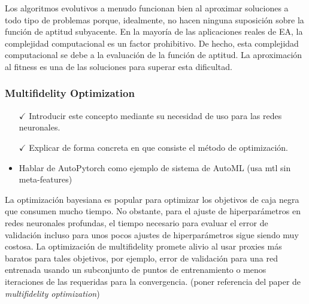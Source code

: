 Los algoritmos evolutivos a menudo funcionan bien al aproximar soluciones a todo tipo de problemas porque, idealmente, no hacen ninguna suposición sobre la función de aptitud subyacente. En la mayoría de las aplicaciones reales de EA, la complejidad computacional es un factor prohibitivo. De hecho, esta complejidad computacional se debe a la evaluación de la función de aptitud. La aproximación al fitness es una de las soluciones para superar esta dificultad.

\subsubsection{Multifidelity Optimization}


\begin{itemize}
	\item[$\checkmark$] Introducir este concepto mediante su necesidad de uso para las redes neuronales.
	\item[$\checkmark$] Explicar de forma concreta en que consiste el método de optimización.
	\item Hablar de AutoPytorch como ejemplo de sistema de AutoML (usa mtl sin meta-features)
\end{itemize}

La optimización bayesiana es popular para optimizar los objetivos de caja negra que consumen mucho tiempo. No obstante, para el ajuste de hiperparámetros en redes neuronales profundas, el tiempo necesario para evaluar el error de validación incluso para unos pocos ajustes de hiperparámetros sigue siendo muy costosa. La optimización de multifidelity promete alivio al usar proxies más baratos para tales objetivos, por ejemplo, error de validación para una red entrenada usando un subconjunto de puntos de entrenamiento o menos iteraciones de las requeridas para la convergencia. (poner referencia del paper de \textit{multifidelity optimization})

